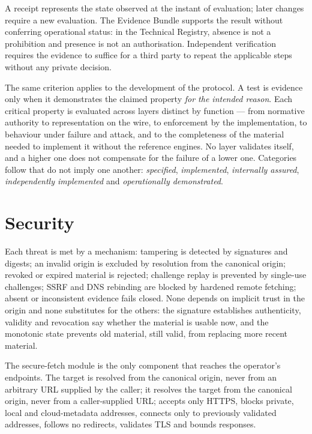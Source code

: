 \documentclass[journal abbreviation, manuscript]{copernicus}
\begin{document}
A receipt represents the state observed at the instant of evaluation; later changes require a new evaluation. The Evidence Bundle supports the result without conferring operational status: in the Technical Registry, absence is not a prohibition and presence is not an authorisation. Independent verification requires the evidence to suffice for a third party to repeat the applicable steps without any private decision.

The same criterion applies to the development of the protocol. A test is evidence only when it demonstrates the claimed property \emph{for the intended reason}. Each critical property is evaluated across layers distinct by function --- from normative authority to representation on the wire, to enforcement by the implementation, to behaviour under failure and attack, and to the completeness of the material needed to implement it without the reference engines. No layer validates itself, and a higher one does not compensate for the failure of a lower one. Categories follow that do not imply one another: \emph{specified}, \emph{implemented}, \emph{internally assured}, \emph{independently implemented} and \emph{operationally demonstrated}.


\section{Security}\label{sec:security}

Each threat is met by a mechanism: tampering is detected by signatures and digests; an invalid origin is excluded by resolution from the canonical origin; revoked or expired material is rejected; challenge replay is prevented by single-use challenges; SSRF and DNS rebinding are blocked by hardened remote fetching; absent or inconsistent evidence fails closed. None depends on implicit trust in the origin and none substitutes for the others: the signature establishes authenticity, validity and revocation say whether the material is usable now, and the monotonic state prevents old material, still valid, from replacing more recent material.

The secure-fetch module is the only component that reaches the operator's endpoints. The target is resolved from the canonical origin, never from an arbitrary URL supplied by the caller; it resolves the target from the canonical origin, never from a caller-supplied URL; accepts only HTTPS, blocks private, local and cloud-metadata addresses, connects only to previously validated addresses, follows no redirects, validates TLS and bounds responses.
\end{document}
